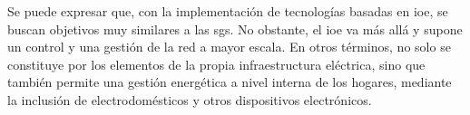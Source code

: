 \vspace{3mm}
\pagebreak

Se puede expresar que, con la implementación de tecnologías basadas en \gls{ioe}, se buscan objetivos muy similares a las \gls{sg}s. No obstante, el \gls{ioe} va más allá y supone un control y una gestión de la red a mayor escala. En otros términos, no solo se constituye por los elementos de la propia infraestructura eléctrica, sino que también permite una gestión energética a nivel interna de los hogares, mediante la inclusión de electrodomésticos y otros dispositivos electrónicos.


